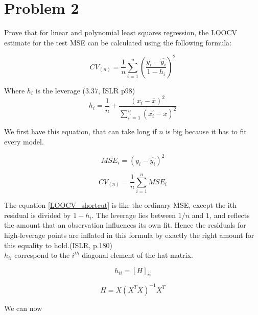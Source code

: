\section*{Problem 2}

\noindent Prove that for linear and polynomial least squares regression, the LOOCV estimate for the test MSE can be calculated using the following formula: 


\begin{equation}
\label{LOOCV_shortcut}
CV_{(n)} = \frac{1}{n} \sum_{i = 1}^{n}\left( \frac{y_i - \hat{y_i}}{1 - h_i} \right)^2
\end{equation}

\noindent Where $ h_i $ is the leverage (3.37, ISLR p98)
\begin{equation}
\label{leverage}
h_i = \frac{1}{n} + \frac{(x_i - \bar{x})^2}{\sum_{i^{'} = 1}^{n} (x_i^{'} - \bar{x})^2}
\end{equation}


\noindent We first have this equation, that can take long if $n$ is big because it has to fit every model.

\[ MSE_i = (y_i - \hat{y_i})^2 \]

\[ CV_{(n)} = \frac{1}{n} \sum_{i = 1}^{n} MSE_i \]


\noindent The equation \ref{LOOCV_shortcut} is like the ordinary MSE, except the ith residual is divided by $1-h_i$. The leverage lies between $1/n$ and $1$, and reflects the amount that an observation influences its own fit. Hence the residuals for high-leverage points are inflated in this formula by exactly the right amount for this equality to hold.(ISLR, p.180)\\

$h_{ii}$ correspond to the $i^{th}$ diagonal element of the hat matrix. 

\[ h_{ii} = [H]_{ii} \]

\[ H = X(X^T X)^{-1} X^T \]


\noindent We can now 







